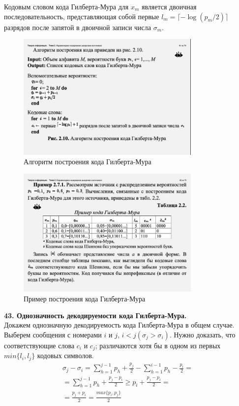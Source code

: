 \documentclass[14pt]{article}
\begin{document}
Кодовым словом кода Гилберта-Мура для \(x_m\) является двоичная
последовательность, представляющая собой первые \(l_m = \lceil -\log(p_m/2) \rceil\)
разрядов после запятой в двоичной записи числа \(\sigma_m\).

\begin{figure}[hb]
\centering
    \includegraphics[width=90mm]{gilbert_alg.png}
\caption{Алгоритм построения кода Гилберта-Мура}
\end{figure}

\begin{figure}[pt]
\centering
    \includegraphics[width=90mm]{gilbert_example.png}
\caption{Пример построения кода Гилберта-Мура}
\end{figure}


\vskip5cm
\textbf{43. Однозначность декодируемости кода Гилберта-Мура.} \\

Докажем однозначную декодируемость кода Гилберта-Мура в общем случае. Выберем сообщения с номерами \(i\) и \(j\), \(i < j (\sigma_j > \sigma_i)\). Нужно доказать, что соответствующие слова \(c_i\) и \(c_j\); различаются хотя бы в одном из первых \(min\{l_i, l_j\}\) кодовых символов.
\begin{displaymath}
    \begin{aligned}
    \sigma_j - \sigma_i = \sum_{h=1}^{j-1} p_h + \frac{p_j}{2} - \sum_{h=1}^{i-1} p_h - \frac{p_i}{2} = \\
    = \sum_{h=1}^{j-1} p_h + \frac{p_j - p_i}{2} \geq p_i + \frac{p_j - p_i}{2} = \\
    = \frac{p_j + p_i}{2} = \frac{max\{p_i, p_j\}}{2}
    \end{aligned}
\end{displaymath}
\end{document}
